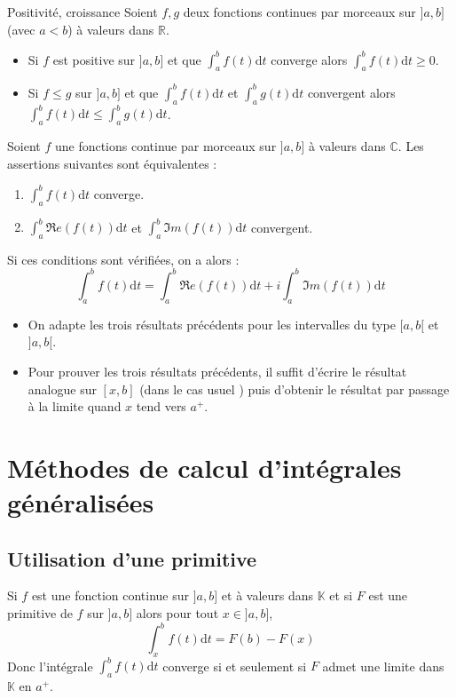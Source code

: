 \documentclass[french,11pt,twoside]{VcCours}
\newcommand{\dt}{\text{d}t}
\begin{document}
\begin{Proposition}{Positivité, croissance}
Soient $f,g$ deux fonctions continues par morceaux sur $]a,b]$ (avec $a<b$) à valeurs dans $\mathbb{R}$.

\begin{itemize}
\item Si $f$ est positive sur $]a,b]$ et que $\int_{a}^b f(t) \dt$ converge 
alors $\int_{a}^b f(t) \dt \geq 0$.
\item Si $f \leq g$ sur $]a,b]$ et que $\int_{a}^b f(t) \dt$ et $\int_{a}^b g(t) \dt$ convergent alors $\int_{a}^b f(t) \dt \leq \int_{a}^b g(t) \dt$.
\end{itemize}
\end{Proposition}

\begin{Proposition}{} Soient $f$ une fonctions continue par morceaux sur $]a,b]$ à valeurs dans $\mathbb{C}$. Les assertions suivantes sont équivalentes :

\begin{enumerate}
\item $\int_{a}^b f(t) \dt$ converge.
\item $\int_{a}^b \Re e(f(t)) \dt$ et $\int_{a}^b \Im m(f(t)) \dt$ convergent.
\end{enumerate}
Si ces conditions sont vérifiées, on a alors :
$$ \int_{a}^b f(t) \dt = \int_{a}^b \Re e(f(t)) \dt + i \int_{a}^b \Im m(f(t)) \dt$$
\end{Proposition}

\newpage
\begin{Remarques}{}
\begin{itemize}
\item On adapte les trois résultats précédents pour les intervalles du type $[a,b[$ et $]a,b[$.
\item Pour prouver les trois résultats précédents, il suffit d'écrire le résultat analogue sur $[x,b]$ (dans le cas \og usuel \fg) puis d'obtenir le résultat par passage à la limite quand $x$ tend vers $a^{+}$.
\end{itemize}
\end{Remarques}{}

\section{Méthodes de calcul d'intégrales généralisées}

\subsection{Utilisation d'une primitive}
Si $f$ est une fonction continue sur $]a,b]$ et à valeurs dans $\mathbb{K}$ et si $F$ est une primitive de $f$ sur $]a,b]$ alors pour tout $x \in ]a,b]$,
$$ \int_{x}^b f(t) \dt = F(b)-F(x)$$
Donc l'intégrale $\int_{a}^b f(t) \dt$ converge si et seulement si $F$ admet une limite dans $\mathbb{K}$ en $a^{+}$.
\end{document}
